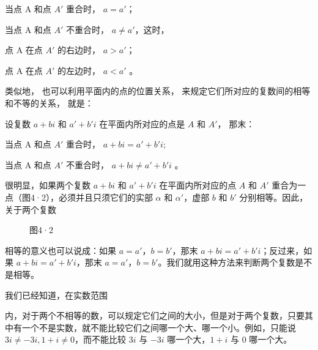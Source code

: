 当点 A 和点 \(A'\) 重合时， \(a = a'\)；

当点 A 和点 \(A'\) 不重合时， \(a \neq a'\)，这时，

点 A 在点 \(A'\) 的右边时， \(a > a'\)；

点 A 在点 \(A'\) 的左边时， \(a < a'\) 。

类似地， 也可以利用平面内的点的位置关系，
来规定它们所对应的复数间的相等和不等的关系， 就是：

设复数 \(a + bi\) 和 \(a' + b'i\) 在平面内所对应的点是 \(A\) 和 \(A'\)，
那末：

当点 A 和点 \(A'\) 重合时， \(a + bi = a' + b'i;\)

当点 A 和点 \(A'\) 不重合时， \(a + bi \neq a' + b'i\) 。

很明显，如果两个复数 \(a + bi\) 和 \(a' + b'i\) 在平面内所对应的点 \(A\)
和 \(A'\) 重合为一点（图4·2），必须并且只须它们的实部 \(\alpha\) 和
\(\alpha'\)，虚部 \(b\) 和 \(b'\) 分别相等。因此，关于两个复数

\begin{figure}
\centering
{}
\caption{图4·2}
\end{figure}
相等的意义也可以说成：如果 \(a = a'\)，\(b = b'\)，那末
\(a + bi = a' + b'i\)；反过来，如果 \(a + bi = a' + b'i\)，那末
\(a = a'\)，\(b = b'\)。我们就用这种方法来判断两个复数是不是相等。

我们已经知道，在实数范围

内，对于两个不相等的数，可以规定它们之间的大小，但是对于两个复数，只要其中有一个不是实数，就不能比较它们之间哪一个大、哪一个小。例如，只能说
\(3i \neq -3i, 1 + i \neq 0\)，而不能比较 \(3i\) 与 \(-3i\)
哪一个大，\(1 + i\) 与 0 哪一个大。

